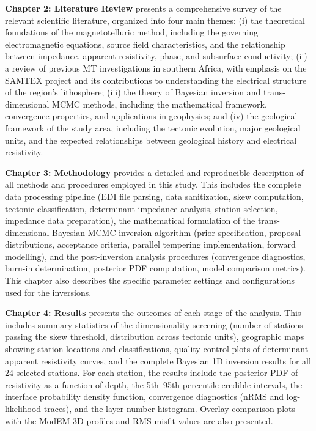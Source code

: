 \textbf{Chapter 2: Literature Review} presents a comprehensive survey of the relevant scientific literature, organized into four main themes: (i) the theoretical foundations of the magnetotelluric method, including the governing electromagnetic equations, source field characteristics, and the relationship between impedance, apparent resistivity, phase, and subsurface conductivity; (ii) a review of previous MT investigations in southern Africa, with emphasis on the SAMTEX project and its contributions to understanding the electrical structure of the region's lithosphere; (iii) the theory of Bayesian inversion and trans-dimensional MCMC methods, including the mathematical framework, convergence properties, and applications in geophysics; and (iv) the geological framework of the study area, including the tectonic evolution, major geological units, and the expected relationships between geological history and electrical resistivity.

\textbf{Chapter 3: Methodology} provides a detailed and reproducible description of all methods and procedures employed in this study. This includes the complete data processing pipeline (EDI file parsing, data sanitization, skew computation, tectonic classification, determinant impedance analysis, station selection, impedance data preparation), the mathematical formulation of the trans-dimensional Bayesian MCMC inversion algorithm (prior specification, proposal distributions, acceptance criteria, parallel tempering implementation, forward modelling), and the post-inversion analysis procedures (convergence diagnostics, burn-in determination, posterior PDF computation, model comparison metrics). This chapter also describes the specific parameter settings and configurations used for the inversions.

\textbf{Chapter 4: Results} presents the outcomes of each stage of the analysis. This includes summary statistics of the dimensionality screening (number of stations passing the skew threshold, distribution across tectonic units), geographic maps showing station locations and classifications, quality control plots of determinant apparent resistivity curves, and the complete Bayesian 1D inversion results for all 24 selected stations. For each station, the results include the posterior PDF of resistivity as a function of depth, the 5th--95th percentile credible intervals, the interface probability density function, convergence diagnostics (nRMS and log-likelihood traces), and the layer number histogram. Overlay comparison plots with the ModEM 3D profiles and RMS misfit values are also presented.

